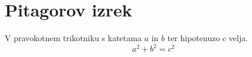 \documentclass{article}
\begin{document}
\section*{Pitagorov izrek}
V pravokotnem trikotniku s katetama \(a\) in \(b\) ter hipotenuzo \(c\) velja.
\[ a^2 + b^2 = c^2 \]
\end{document}

